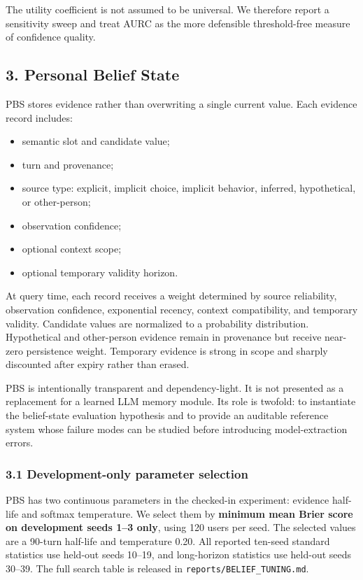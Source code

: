 \documentclass[
  10pt,
  letterpaper,
]{article}
\providecommand{\tightlist}{%
  \setlength{\itemsep}{0pt}\setlength{\parskip}{0pt}}
\begin{document}
The utility coefficient is not assumed to be universal. We therefore
report a sensitivity sweep and treat AURC as the more defensible
threshold-free measure of confidence quality.

\subsection{3. Personal Belief State}\label{personal-belief-state}

PBS stores evidence rather than overwriting a single current value. Each
evidence record includes:

\begin{itemize}
\tightlist
\item
  semantic slot and candidate value;
\item
  turn and provenance;
\item
  source type: explicit, implicit choice, implicit behavior, inferred,
  hypothetical, or other-person;
\item
  observation confidence;
\item
  optional context scope;
\item
  optional temporary validity horizon.
\end{itemize}

At query time, each record receives a weight determined by source
reliability, observation confidence, exponential recency, context
compatibility, and temporary validity. Candidate values are normalized
to a probability distribution. Hypothetical and other-person evidence
remain in provenance but receive near-zero persistence weight. Temporary
evidence is strong in scope and sharply discounted after expiry rather
than erased.

PBS is intentionally transparent and dependency-light. It is not
presented as a replacement for a learned LLM memory module. Its role is
twofold: to instantiate the belief-state evaluation hypothesis and to
provide an auditable reference system whose failure modes can be studied
before introducing model-extraction errors.

\subsubsection{3.1 Development-only parameter
selection}\label{development-only-parameter-selection}

PBS has two continuous parameters in the checked-in experiment: evidence
half-life and softmax temperature. We select them by \textbf{minimum
mean Brier score on development seeds 1--3 only}, using 120 users per
seed. The selected values are a 90-turn half-life and temperature 0.20.
All reported ten-seed standard statistics use held-out seeds 10--19, and
long-horizon statistics use held-out seeds 30--39. The full search table
is released in \texttt{reports/BELIEF\_TUNING.md}.
\end{document}
